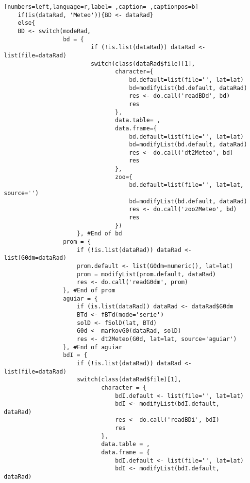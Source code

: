 \begin{lstlisting}[numbers=left,language=r,label= ,caption= ,captionpos=b]
    if(is(dataRad, 'Meteo')){BD <- dataRad}
    else{
    BD <- switch(modeRad,
                 bd = {
                         if (!is.list(dataRad)) dataRad <- list(file=dataRad)
                         switch(class(dataRad$file)[1],
                                character={
                                    bd.default=list(file='', lat=lat)
                                    bd=modifyList(bd.default, dataRad)
                                    res <- do.call('readBDd', bd)
                                    res
                                },
                                data.table= ,
                                data.frame={
                                    bd.default=list(file='', lat=lat)
                                    bd=modifyList(bd.default, dataRad)
                                    res <- do.call('dt2Meteo', bd)
                                    res
                                },
                                zoo={
                                    bd.default=list(file='', lat=lat, source='')
                                    bd=modifyList(bd.default, dataRad)
                                    res <- do.call('zoo2Meteo', bd)
                                    res
                                })
                     }, #End of bd
                 prom = {
                     if (!is.list(dataRad)) dataRad <- list(G0dm=dataRad)
                     prom.default <- list(G0dm=numeric(), lat=lat)
                     prom = modifyList(prom.default, dataRad)
                     res <- do.call('readG0dm', prom)
                 }, #End of prom
                 aguiar = {
                     if (is.list(dataRad)) dataRad <- dataRad$G0dm
                     BTd <- fBTd(mode='serie')
                     solD <- fSolD(lat, BTd)
                     G0d <- markovG0(dataRad, solD)
                     res <- dt2Meteo(G0d, lat=lat, source='aguiar')
                 }, #End of aguiar
                 bdI = {
                     if (!is.list(dataRad)) dataRad <- list(file=dataRad)
                     switch(class(dataRad$file)[1],
                            character = {
                                bdI.default <- list(file='', lat=lat)
                                bdI <- modifyList(bdI.default, dataRad)
                                res <- do.call('readBDi', bdI)
                                res
                            },
                            data.table = ,
                            data.frame = {
                                bdI.default <- list(file='', lat=lat)
                                bdI <- modifyList(bdI.default, dataRad)

\end{lstlisting}
